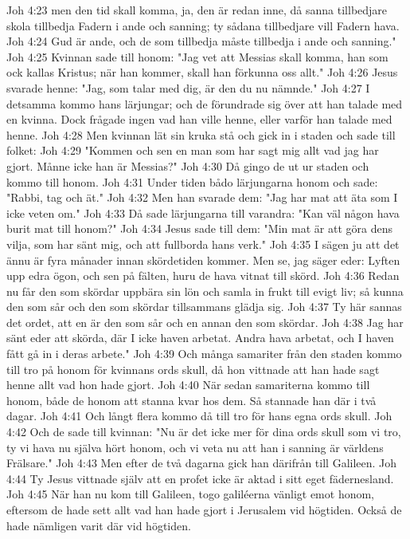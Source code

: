 Joh 4:23  men den tid skall komma, ja, den är redan inne, då sanna tillbedjare skola tillbedja Fadern i ande och sanning; ty sådana tillbedjare vill Fadern hava.
Joh 4:24  Gud är ande, och de som tillbedja måste tillbedja i ande och sanning."
Joh 4:25  Kvinnan sade till honom: "Jag vet att Messias skall komma, han som ock kallas Kristus; när han kommer, skall han förkunna oss allt."
Joh 4:26  Jesus svarade henne: "Jag, som talar med dig, är den du nu nämnde."
Joh 4:27  I detsamma kommo hans lärjungar; och de förundrade sig över att han talade med en kvinna. Dock frågade ingen vad han ville henne, eller varför han talade med henne.
Joh 4:28  Men kvinnan lät sin kruka stå och gick in i staden och sade till folket:
Joh 4:29  "Kommen och sen en man som har sagt mig allt vad jag har gjort. Månne icke han är Messias?"
Joh 4:30  Då gingo de ut ur staden och kommo till honom.
Joh 4:31  Under tiden bådo lärjungarna honom och sade: "Rabbi, tag och ät."
Joh 4:32  Men han svarade dem: "Jag har mat att äta som I icke veten om."
Joh 4:33  Då sade lärjungarna till varandra: "Kan väl någon hava burit mat till honom?"
Joh 4:34  Jesus sade till dem: "Min mat är att göra dens vilja, som har sänt mig, och att fullborda hans verk."
Joh 4:35  I sägen ju att det ännu är fyra månader innan skördetiden kommer. Men se, jag säger eder: Lyften upp edra ögon, och sen på fälten, huru de hava vitnat till skörd.
Joh 4:36  Redan nu får den som skördar uppbära sin lön och samla in frukt till evigt liv; så kunna den som sår och den som skördar tillsammans glädja sig.
Joh 4:37  Ty här sannas det ordet, att en är den som sår och en annan den som skördar.
Joh 4:38  Jag har sänt eder att skörda, där I icke haven arbetat. Andra hava arbetat, och I haven fått gå in i deras arbete."
Joh 4:39  Och många samariter från den staden kommo till tro på honom för kvinnans ords skull, då hon vittnade att han hade sagt henne allt vad hon hade gjort.
Joh 4:40  När sedan samariterna kommo till honom, både de honom att stanna kvar hos dem. Så stannade han där i två dagar.
Joh 4:41  Och långt flera kommo då till tro för hans egna ords skull.
Joh 4:42  Och de sade till kvinnan: "Nu är det icke mer för dina ords skull som vi tro, ty vi hava nu själva hört honom, och vi veta nu att han i sanning är världens Frälsare."
Joh 4:43  Men efter de två dagarna gick han därifrån till Galileen.
Joh 4:44  Ty Jesus vittnade själv att en profet icke är aktad i sitt eget fädernesland.
Joh 4:45  När han nu kom till Galileen, togo galiléerna vänligt emot honom, eftersom de hade sett allt vad han hade gjort i Jerusalem vid högtiden. Också de hade nämligen varit där vid högtiden.
